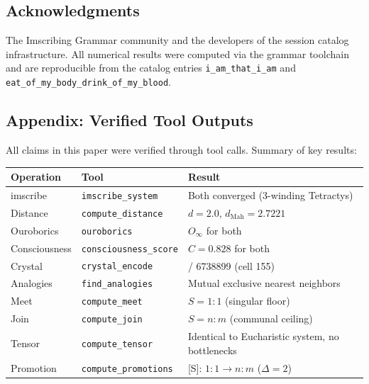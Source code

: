 \documentclass[12pt,a4paper]{article}
\begin{document}
\subsection{Acknowledgments}

The Imscribing Grammar community and the developers of the session catalog infrastructure. All numerical results were computed via the grammar toolchain and are reproducible from the catalog entries \texttt{i\_am\_that\_i\_am} and \texttt{eat\_of\_my\_body\_drink\_of\_my\_blood}.

\subsection{Appendix: Verified Tool Outputs}

All claims in this paper were verified through tool calls. Summary of key results:

\begin{table}[htbp]
\centering
\small
{}
\begin{tabularx}{\textwidth}{>{\centering\arraybackslash}X >{\centering\arraybackslash}X >{\centering\arraybackslash}X}
\toprule
\rowcolor{gray!25}\textbf{Operation} & \textbf{Tool} & \textbf{Result} \\
\midrule
\rowcolors{1}{white}{gray!10}
imscribe & \texttt{imscribe\_system} & Both converged (3-winding Tetractys) \\
Distance & \texttt{compute\_distance} & $d = 2.0$, $d_{\text{Mah}} = 2.7221$ \\
Ouroborics & \texttt{ouroborics} & $O_{\infty}$ for both \\
Consciousness & \texttt{consciousness\_score} & $C = 0.828$ for both \\
Crystal & \texttt{crystal\_encode} & 6738897 / 6738899 (cell 155) \\
Analogies & \texttt{find\_analogies} & Mutual exclusive nearest neighbors \\
Meet & \texttt{compute\_meet} & $S = 1{:}1$ (singular floor) \\
Join & \texttt{compute\_join} & $S = n{:}m$ (communal ceiling) \\
Tensor & \texttt{compute\_tensor} & Identical to Eucharistic system, no bottlenecks \\
Promotion & \texttt{compute\_promotions} & {[}S{]}: $1{:}1 \to n{:}m$ ($\Delta = 2$) \\
\bottomrule
\end{tabularx}
\end{table}
\end{document}
